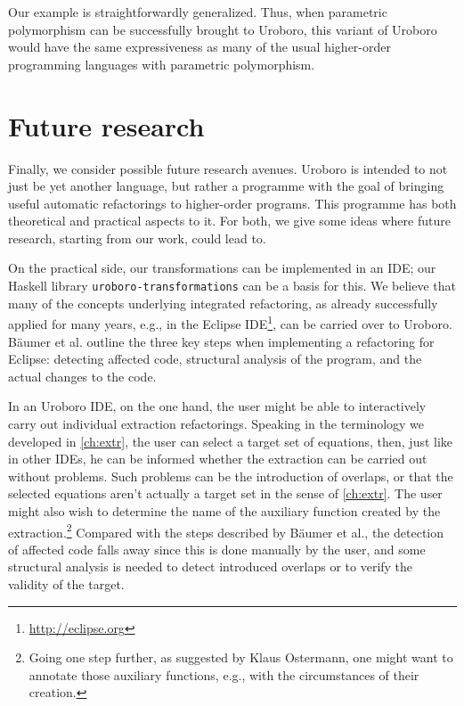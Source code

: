 Our example is straightforwardly generalized. Thus, when parametric polymorphism can be successfully brought to Uroboro, this variant of Uroboro would have the same expressiveness as many of the usual higher-order programming languages with parametric polymorphism.

\section{Future research}
\label{sec:futr}

Finally, we consider possible future research avenues. Uroboro is intended to not just be yet another language, but rather a programme with the goal of bringing useful automatic refactorings to higher-order programs. This programme has both theoretical and practical aspects to it. For both, we give some ideas where future research, starting from our work, could lead to.

On the practical side, our transformations can be implemented in an IDE; our Haskell library \texttt{uroboro-transformations} can be a basis for this. We believe that many of the concepts underlying integrated refactoring, as already successfully applied for many years, e.g., in the Eclipse IDE\footnote{\url{http://eclipse.org}}, can be carried over to Uroboro. Bäumer et al.\cite{baumer2001integrating} outline the three key steps when implementing a refactoring for Eclipse: detecting affected code, structural analysis of the program, and the actual changes to the code.

In an Uroboro IDE, on the one hand, the user might be able to interactively carry out individual extraction refactorings. Speaking in the terminology we developed in \autoref{ch:extr}, the user can select a target set of equations, then, just like in other IDEs, he can be informed whether the extraction can be carried out without problems. Such problems can be the introduction of overlaps, or that the selected equations aren't actually a target set in the sense of \autoref{ch:extr}. The user might also wish to determine the name of the auxiliary function created by the extraction.\footnote{Going one step further, as suggested by Klaus Ostermann, one might want to annotate those auxiliary functions, e.g., with the circumstances of their creation.} Compared with the steps described by Bäumer et al., the detection of affected code falls away since this is done manually by the user, and some structural analysis is needed to detect introduced overlaps or to verify the validity of the target.

